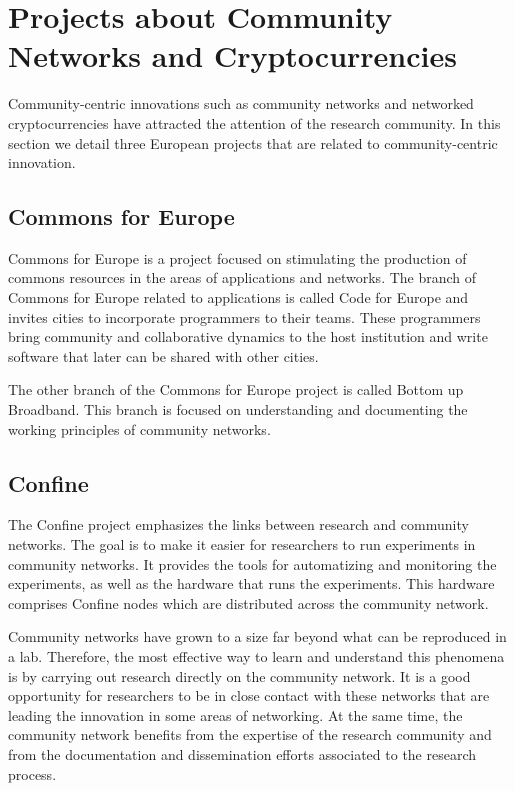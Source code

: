 \documentclass[journal]{IEEEtran}
\begin{document}
\section{Projects about Community Networks and Cryptocurrencies}
\label{sec:projects}

Community-centric innovations such as community networks and networked cryptocurrencies have attracted the attention of the research community.
In this section we detail three European projects that are related to community-centric innovation.

\subsection{Commons for Europe}
Commons for Europe is a project focused on stimulating the production of commons resources in the areas of applications and networks.
The branch of Commons for Europe related to applications is called Code for Europe and invites cities to incorporate programmers to their teams.
These programmers bring community and collaborative dynamics to the host institution and write software that later can be shared with other cities.

The other branch of the Commons for Europe project is called Bottom up Broadband.
This branch is focused on understanding and documenting the working principles of community networks.

\subsection{Confine}
The Confine project \cite{braem2013crc} emphasizes the links between research and community networks.
The goal is to make it easier for researchers to run experiments in community networks.
It provides the tools for automatizing and monitoring the experiments, as well as the hardware that runs the experiments.
This hardware comprises Confine nodes which are distributed across the community network.

Community networks have grown to a size far beyond what can be reproduced in a lab.
Therefore, the most effective way to learn and understand this phenomena is by carrying out research directly on the community network.
It is a good opportunity for researchers to be in close contact with these networks that are leading the innovation in some areas of networking.
At the same time, the community network benefits from the expertise of the research community and from the documentation and dissemination efforts associated to the research process.
\end{document}
